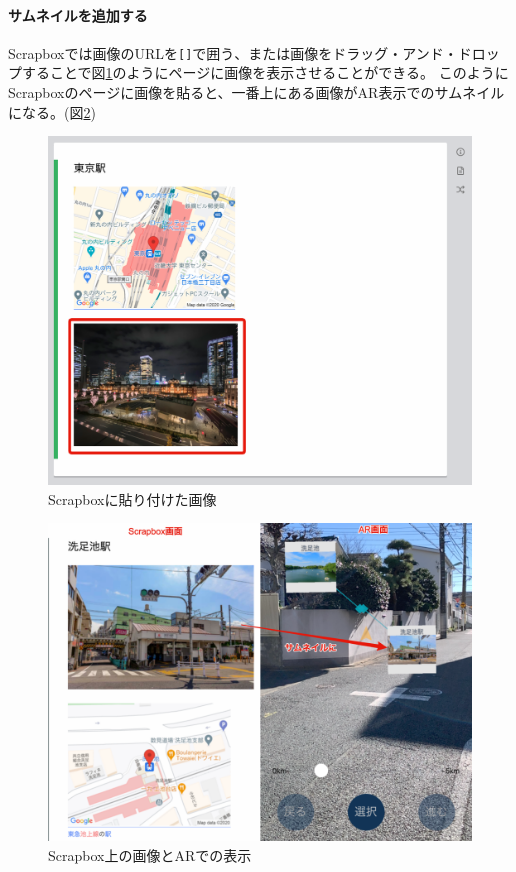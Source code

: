 \paragraph*{サムネイルを追加する}
Scrapboxでは画像のURLを\texttt{[]}で囲う、または画像をドラッグ・アンド・ドロップすることで図\ref{fig:scrapbox_thumbnail}のようにページに画像を表示させることができる。
このようにScrapboxのページに画像を貼ると、一番上にある画像がAR表示でのサムネイルになる。(図\ref{fig:scrapbox_thumbnail_and_ar})

\begin{figure}[htbp]
  \centering
  \includegraphics[width=120mm]{images/scrapbox_thumbnail.png}
  \caption{Scrapboxに貼り付けた画像} \label{fig:scrapbox_thumbnail}
\end{figure}

\begin{figure}[htbp]
  \centering
  \includegraphics[width=120mm]{images/scrapbox_thumbnail_and_ar.png}
  \caption{Scrapbox上の画像とARでの表示} \label{fig:scrapbox_thumbnail_and_ar}
\end{figure}

